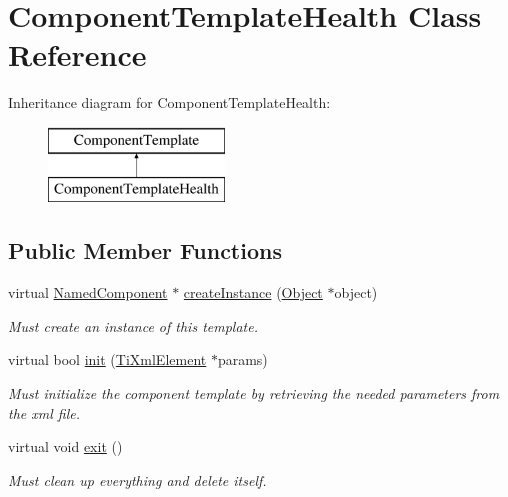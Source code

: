 \hypertarget{classComponentTemplateHealth}{
\section{\-Component\-Template\-Health \-Class \-Reference}
\label{d1/d7d/classComponentTemplateHealth}
}
\-Inheritance diagram for \-Component\-Template\-Health\-:\begin{figure}[H]
\begin{center}
\leavevmode
\includegraphics[height=2.000000cm]{d1/d7d/classComponentTemplateHealth}
\end{center}
\end{figure}
\subsection*{\-Public \-Member \-Functions}
\begin{DoxyCompactItemize}
\item 
\hypertarget{classComponentTemplateHealth_ad869f579c6168c691d0dbe29c38c4a00}{
virtual \hyperlink{classNamedComponent}{\-Named\-Component} $\ast$ \hyperlink{classComponentTemplateHealth_ad869f579c6168c691d0dbe29c38c4a00}{create\-Instance} (\hyperlink{classObject}{\-Object} $\ast$object)}
\label{d1/d7d/classComponentTemplateHealth_ad869f579c6168c691d0dbe29c38c4a00}

\begin{DoxyCompactList}\small\item\em \-Must create an instance of this template. \end{DoxyCompactList}\item 
\hypertarget{classComponentTemplateHealth_ad58d203c87772b2c30e11f84570e63bb}{
virtual bool \hyperlink{classComponentTemplateHealth_ad58d203c87772b2c30e11f84570e63bb}{init} (\hyperlink{classTiXmlElement}{\-Ti\-Xml\-Element} $\ast$params)}
\label{d1/d7d/classComponentTemplateHealth_ad58d203c87772b2c30e11f84570e63bb}

\begin{DoxyCompactList}\small\item\em \-Must initialize the component template by retrieving the needed parameters from the xml file. \end{DoxyCompactList}\item 
\hypertarget{classComponentTemplateHealth_af3c0394a21b9aa9a13dd140f49d7004f}{
virtual void \hyperlink{classComponentTemplateHealth_af3c0394a21b9aa9a13dd140f49d7004f}{exit} ()}
\label{d1/d7d/classComponentTemplateHealth_af3c0394a21b9aa9a13dd140f49d7004f}

\begin{DoxyCompactList}\small\item\em \-Must clean up everything and delete itself. \end{DoxyCompactList}\end{DoxyCompactItemize}
